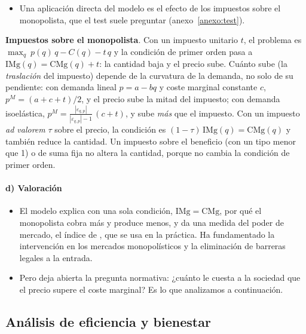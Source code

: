 \documentclass[11pt]{article}
\begin{document}
\begin{itemize}
\item Una aplicación directa del modelo es el efecto de los impuestos sobre el monopolista, que el test suele preguntar (anexo~\ref{anexo:test}).
\end{itemize}

\begin{anotaciones}
\textbf{Impuestos sobre el monopolista}. Con un impuesto unitario $t$, el problema es $\max_q\ p(q)\,q-C(q)-t\,q$ y la condición de primer orden pasa a $\mathrm{IMg}(q)=\mathrm{CMg}(q)+t$: la cantidad baja y el precio sube. Cuánto sube (la \emph{traslación} del impuesto) depende de la curvatura de la demanda, no solo de su pendiente\nocite{BulowPfleiderer1983Note}: con demanda lineal $p=a-bq$ y coste marginal constante $c$, $p^M=(a+c+t)/2$, y el precio sube la mitad del impuesto; con demanda isoelástica, $p^M=\frac{|\varepsilon_{q,p}|}{|\varepsilon_{q,p}|-1}\,(c+t)$, y sube \emph{más} que el impuesto. Con un impuesto \emph{ad valorem} $\tau$ sobre el precio, la condición es $(1-\tau)\,\mathrm{IMg}(q)=\mathrm{CMg}(q)$ y también reduce la cantidad. Un impuesto sobre el beneficio (con un tipo menor que 1) o de suma fija no altera la cantidad, porque no cambia la condición de primer orden.
\end{anotaciones}

\paragraph{d) Valoración}

\begin{itemize}
\item El modelo explica con una sola condición, $\mathrm{IMg}=\mathrm{CMg}$, por qué el monopolista cobra más y produce menos, y da una medida del poder de mercado, el índice de , que se usa en la práctica. Ha fundamentado la intervención en los mercados monopolísticos y la eliminación de barreras legales a la entrada.
\item Pero deja abierta la pregunta normativa: ¿cuánto le cuesta a la sociedad que el precio supere el coste marginal? Es lo que analizamos a continuación.
\end{itemize}

\subsection{Análisis de eficiencia y bienestar}\label{sec:analisis-eficiencia-bienestar}
\end{document}
